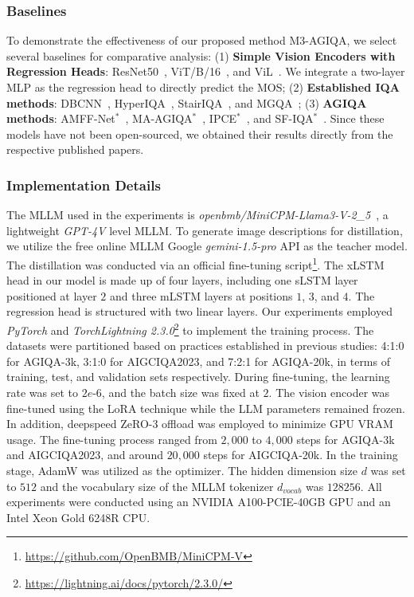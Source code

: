 \subsubsection{Baselines}
To demonstrate the effectiveness of our proposed method M3-AGIQA, we select several baselines for comparative analysis: 
(1) \textbf{Simple Vision Encoders with Regression Heads}: ResNet50~\cite{he2016deep}, ViT/B/16~\cite{dosovitskiy2020image}, and ViL~\cite{alkin2024visionlstm}. We integrate a two-layer MLP as the regression head to directly predict the MOS; 
(2) \textbf{Established IQA methods}: DBCNN~\cite{zhang2018blind}, HyperIQA~\cite{Su_2020_CVPR}, StairIQA~\cite{sun2022blind}, and MGQA~\cite{wang2021multi}; 
(3) \textbf{AGIQA methods}: AMFF-Net$^\ast$~\cite{zhou2024adaptive}, MA-AGIQA$^\ast$~\cite{wang2024large}, IPCE$^\ast$~\cite{peng2024aigc}, and SF-IQA$^\ast$~\cite{yu2024sf}. 
Since these models have not been open-sourced, we obtained their results directly from the respective published papers.
\subsubsection{Implementation Details}
The MLLM used in the experiments is \textit{openbmb/MiniCPM-Llama3-V-2\_5}~\cite{yao2024minicpmv}, a lightweight \textit{GPT-4V} level MLLM. 
To generate image descriptions for distillation, we utilize the free online MLLM Google \textit{gemini-1.5-pro} API as the teacher model.
The distillation was conducted via an official fine-tuning script\footnote{\url{https://github.com/OpenBMB/MiniCPM-V}}. 
The xLSTM head in our model is made up of four layers, including one sLSTM layer positioned at layer $2$ and three mLSTM layers at positions $1$, $3$, and $4$.
The regression head is structured with two linear layers.
Our experiments employed \textit{PyTorch} and \textit{TorchLightning 2.3.0}\footnote{\url{https://lightning.ai/docs/pytorch/2.3.0/}} to implement the training process.
The datasets were partitioned based on practices established in previous studies: 4:1:0 for AGIQA-3k, 3:1:0 for AIGCIQA2023, and 7:2:1 for AGIQA-20k, in terms of training, test, and validation sets respectively.
During fine-tuning, the learning rate was set to $2e$-$6$, and the batch size was fixed at $2$.
The vision encoder was fine-tuned using the LoRA technique while the LLM parameters remained frozen.
In addition, deepspeed ZeRO-3 offload was employed to minimize GPU VRAM usage.
The fine-tuning process ranged from $2,000$ to $4,000$ steps for AGIQA-3k and AIGCIQA2023, and around $20,000$ steps for AIGCIQA-20k.
In the training stage, AdamW was utilized as the optimizer.
The hidden dimension size $d$ was set to $512$ and the vocabulary size of the MLLM tokenizer $d_{vocab}$ was $128256$.
All experiments were conducted using an NVIDIA A100-PCIE-40GB GPU and an Intel Xeon Gold 6248R CPU.
